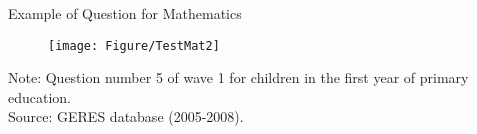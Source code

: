 \documentclass{beamer}
\begin{document}
\begin{frame}{Example of Question for Mathematics}
\vspace{-0.5cm}
\begin{figure}[htb]
\vspace{-0.5cm}
\centering
\texttt{[image: Figure/TestMat2]}
\end{figure}
     \vspace{-1.72cm}  \hspace{-1pt}
\begin{minipage}{1\textwidth} 
{{\fontsize{4}{4}\selectfont
Note: Question number 5 of wave 1 for children in the first year of primary education. \\  
Source: GERES database (2005-2008).\par}}
\end{minipage} 
\end{frame}
\end{document}
